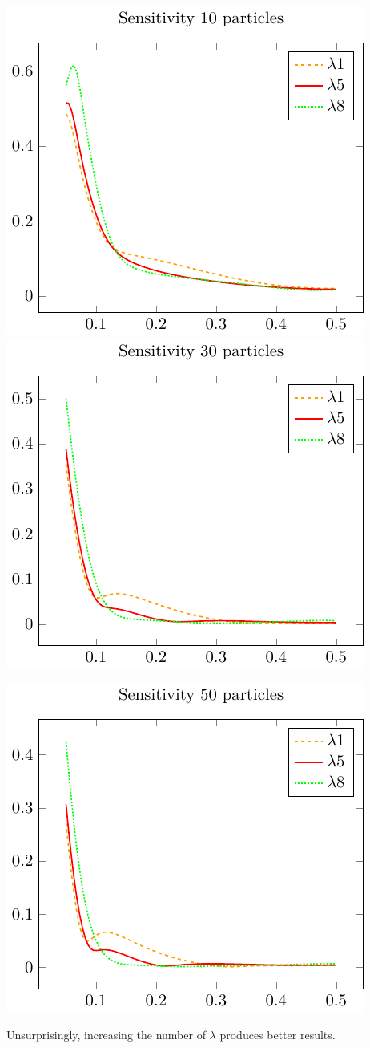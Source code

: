\includegraphics{./gfx/sensitivity_compare10.pdf}
\includegraphics{./gfx/sensitivity_compare30.pdf}

\begin{center}
	\includegraphics{./gfx/sensitivity_compare50.pdf}
\end{center}

Unsurprisingly, increasing the number of $ \lambda $ produces better results.
